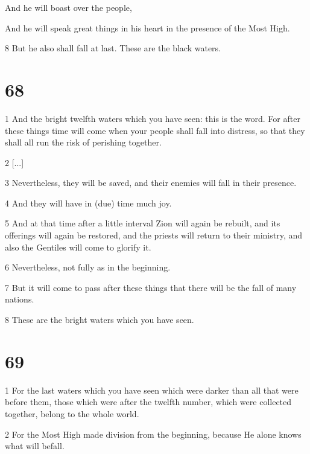 \par And he will boast over the people,

\par And he will speak great things in his heart in the presence of the Most High.

\par 8 But he also shall fall at last. These are the black waters.

\chapter{68}

\par 1 And the bright twelfth waters which you have seen: this is the word. For after these things time will come when your people shall fall into distress, so that they shall all run the risk of perishing together. 

\par 2 [...]

\par 3 Nevertheless, they will be saved, and their enemies will fall in their presence. 

\par 4 And they will have in (due) time much joy. 

\par 5 And at that time after a little interval Zion will again be rebuilt, and its offerings will again be restored, and the priests will return to their ministry, and also the Gentiles will come to glorify it. 

\par 6 Nevertheless, not fully as in the beginning. 

\par 7 But it will come to pass after these things that there will be the fall of many nations. 

\par 8 These are the bright waters which you have seen.

\chapter{69}

\par 1 For the last waters which you have seen which were darker than all that were before them, those which were after the twelfth number, which were collected together, belong to the whole world. 

\par 2 For the Most High made division from the beginning, because He alone knows what will befall. 

